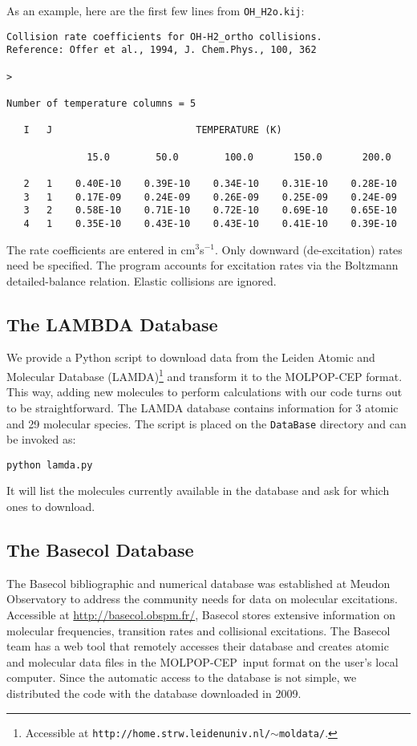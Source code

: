\documentclass[12pt]{article}
\def\M{MOLPOP-CEP}
\begin{document}
As an example, here are the first few lines from \texttt{OH\_H2o.kij}:
\begin{verbatim}
Collision rate coefficients for OH-H2_ortho collisions.
Reference: Offer et al., 1994, J. Chem.Phys., 100, 362

>

Number of temperature columns = 5

   I   J                         TEMPERATURE (K)

              15.0        50.0        100.0       150.0       200.0

   2   1    0.40E-10    0.39E-10    0.34E-10    0.31E-10    0.28E-10
   3   1    0.17E-09    0.24E-09    0.26E-09    0.25E-09    0.24E-09
   3   2    0.58E-10    0.71E-10    0.72E-10    0.69E-10    0.65E-10
   4   1    0.35E-10    0.43E-10    0.43E-10    0.41E-10    0.39E-10
\end{verbatim}
The rate coefficients are entered in cm$^3$s$^{-1}$.  Only downward
(de-excitation) rates need be specified. The program accounts for excitation
rates via the Boltzmann detailed-balance relation. Elastic collisions are
ignored.

\subsection{The LAMBDA Database}
We provide a Python script to download data from the Leiden Atomic and Molecular Database (LAMDA)\footnote{Accessible at \texttt{http://home.strw.leidenuniv.nl/$\sim$moldata/}.}
and transform it to the MOLPOP-CEP format. This way, adding new molecules to perform calculations with 
our code turns out to be straightforward. The LAMDA database contains information for 3 atomic and 29 molecular species. The
script is placed on the \texttt{DataBase} directory and can be invoked as:
\begin{verbatim}
python lamda.py
\end{verbatim}
It will list the molecules currently available in the database and ask for which ones to download.

\subsection{The Basecol Database}
The Basecol bibliographic and numerical database was established at Meudon
Observatory to address the community needs for data on molecular excitations.
Accessible at \url{http://basecol.obspm.fr/}, Basecol stores extensive
information on molecular frequencies, transition rates and collisional
excitations. The Basecol team has a web tool
that remotely accesses their database and creates atomic and molecular data
files in the \M\ input format on the user's local computer. Since the automatic
access to the database is not simple, we distributed the code with the
database downloaded in 2009.
\end{document}
